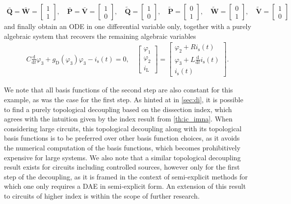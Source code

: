 \documentclass[AMA,STIX1COL]{WileyNJD-v2}
\newcommand{\mbt}[1]{\tilde{\mathbf{#1}}}
\newcommand{\mbb}[1]{\bar{\mathbf{#1}}}
\newcommand{\mr}[1]{\mathrm{#1}}
\newcommand{\ddt}{\frac{\mathrm{d}}{\mathrm{d}t}}
\begin{document}
\begin{align*}
    \mbb{Q} = \mbb{W} = \begin{bmatrix}
        1\\
        1
    \end{bmatrix}, \quad \mbb{P} = \mbb{V} = \begin{bmatrix}
        1\\
        0
    \end{bmatrix}, \quad \mbt{Q} = \begin{bmatrix}
        1\\
        0
    \end{bmatrix}, \quad \mbt{P} = \begin{bmatrix}
        0\\
        1
    \end{bmatrix}, \quad \mbt{W} = \begin{bmatrix}
        0\\
        1
    \end{bmatrix}, \quad \mbt{V} = \begin{bmatrix}
        1\\
        0
    \end{bmatrix}
\end{align*}
and finally obtain an ODE in one differential variable only, together with a purely algebraic system that recovers the remaining algebraic variables
\begin{align}
    C \ddt \varphi_3 + g_\mr{D}(\varphi_3) \varphi_3 - i_\mr{s}(t) = 0, \quad \begin{bmatrix}
        \varphi_1\\
        \varphi_2\\
        i_\mr{L}
    \end{bmatrix} = \begin{bmatrix}
        \varphi_2 + R i_\mr{s}(t)\\
        \varphi_3 + L \ddt i_\mr{s}(t)\\
        i_\mr{s}(t)
    \end{bmatrix} \label{eq:itc_do2}.
\end{align}

We note that all basis functions of the second step are also constant for this example, as was the case for the first step. As hinted at in \autoref{sec:di}, it is possible to find a purely topological decoupling based on the dissection index\cite{jansen2014}, which agrees with the intuition given by the index result from \autoref{th:ic_imna}. When considering large circuits, this topological decoupling along with its topological basis functions is to be preferred over other basis function choices, as it avoids the numerical computation of the basis functions, which becomes prohibitively expensive for large systems. We also note that a similar topological decoupling result exists for circuits including controlled sources, however only for the first step of the decoupling, as it is framed in the context of semi-explicit methods for which one only requires a DAE in semi-explicit form\cite{jansen2014}. An extension of this result to circuits of higher index is within the scope of further research.
\end{document}
